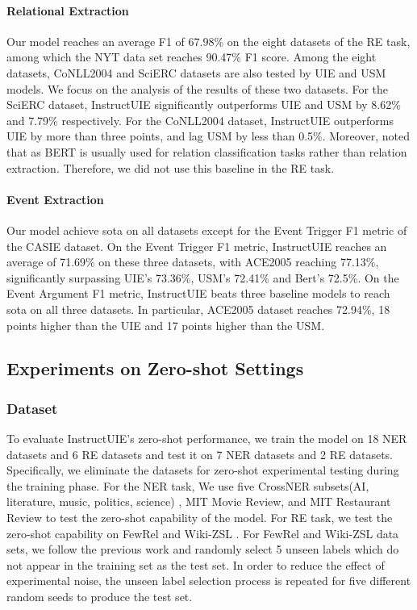 \paragraph{Relational Extraction}
Our model reaches an average F1 of 67.98\% on the eight datasets of the RE task, among which the NYT data set reaches 90.47\% F1 score. Among the eight datasets, CoNLL2004 and SciERC datasets are also tested by UIE and USM models. We focus on the analysis of the results of these two datasets. For the SciERC dataset, InstructUIE significantly outperforms UIE and USM by 8.62\% and 7.79\% respectively. For the CoNLL2004 dataset, InstructUIE outperforms UIE by more than three points, and lag USM by less than 0.5\%.
Moreover, noted that as BERT is usually used for relation classification tasks rather than relation extraction. Therefore, we did not use this baseline in the RE task.

\paragraph{Event Extraction}
Our model achieve sota on all datasets except for the Event Trigger F1 metric of the CASIE dataset. On the Event Trigger F1 metric, InstructUIE reaches an average of 71.69\% on these three datasets, with ACE2005 reaching 77.13\%, significantly surpassing UIE's 73.36\%,  USM's 72.41\% and Bert's 72.5\%. On the Event Argument F1 metric, InstructUIE beats three baseline models to reach sota on all three datasets. In particular, ACE2005 dataset reaches 72.94\%, 18 points higher than the UIE and 17 points higher than the USM.

\subsection{Experiments on Zero-shot Settings}

\subsubsection{Dataset}
To evaluate InstructUIE's zero-shot performance, we train the model on 18 NER datasets and 6 RE datasets and test it on 7 NER datasets and 2 RE datasets. Specifically, we eliminate the datasets for zero-shot experimental testing during the training phase. 
For the NER task, We use five CrossNER subsets(AI, literature, music, politics, science) \cite{CrossNERDATASET}, MIT Movie Review, and MIT Restaurant Review \cite{MITReviewDataset} to test the zero-shot capability of the model. 
For RE task, we test the zero-shot capability on FewRel \cite{FewRelDATASET} and Wiki-ZSL \cite{Wiki-ZSLDATASET}. For FewRel and Wiki-ZSL data sets, we follow the previous work \cite{relationprompt} and randomly select 5 unseen labels which do not appear in the training set as the test set. In order to reduce the effect of experimental noise, the unseen label selection process is repeated for five different random seeds to produce the test set.

